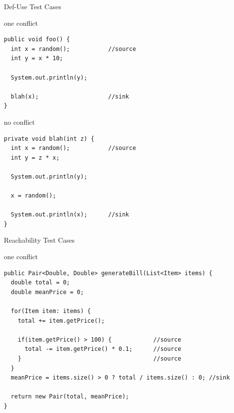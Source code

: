 \documentclass{beamer}
\begin{document}
\begin{frame}
  \huge{Def-Use Test Cases}
\end{frame}
\begin{frame}[fragile]
  \begin{block}{one conflict}
  \begin{lstlisting}
public void foo() {
  int x = random();           //source
  int y = x * 10;

  System.out.println(y);
  
  blah(x);                    //sink
}
  \end{lstlisting}
  \end{block}
\pause
    \begin{block}{no conflict}
      \begin{lstlisting}
private void blah(int z) {
  int x = random();           //source
  int y = z * x;
  
  System.out.println(y);

  x = random();              
  
  System.out.println(x);      //sink
}
  \end{lstlisting}
 \end{block}
\end{frame}


\begin{frame}
  \huge{Reachability Test Cases}
\end{frame}

\begin{frame}[fragile]
\begin{block}{one conflict}     
  \begin{lstlisting}
public Pair<Double, Double> generateBill(List<Item> items) {
  double total = 0;
  double meanPrice = 0;

  for(Item item: items) {
    total += item.getPrice();
    
    if(item.getPrice() > 100) {            //source
      total -= item.getPrice() * 0.1;      //source
    }                                      //source
  }
  meanPrice = items.size() > 0 ? total / items.size() : 0; //sink

  return new Pair(total, meanPrice);
}
\end{lstlisting}
\end{block}
\end{frame}
\end{document}
